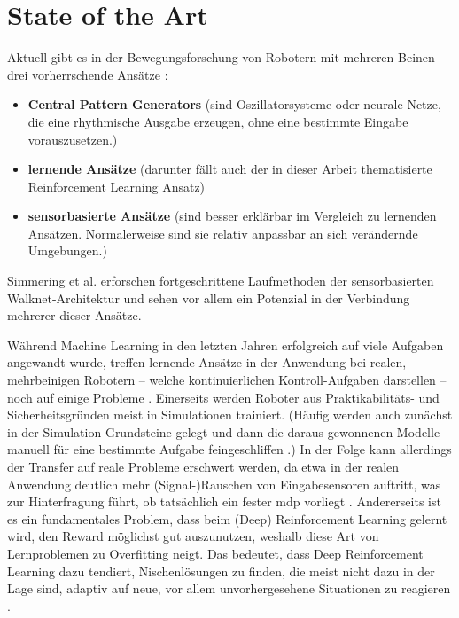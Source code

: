 \chapter{State of the Art}
Aktuell gibt es in der Bewegungsforschung von Robotern mit mehreren Beinen drei vorherrschende Ansätze \cite{simmering2023walknet}:
\begin{itemize}
    \item \textbf{Central Pattern Generators} (sind Oszillatorsysteme oder neurale Netze, die eine rhythmische Ausgabe erzeugen, ohne eine bestimmte Eingabe vorauszusetzen.)
    \item \textbf{lernende Ansätze} (darunter fällt auch der in dieser Arbeit thematisierte Reinforcement Learning Ansatz)
    \item \textbf{sensorbasierte Ansätze} (sind besser erklärbar im Vergleich zu lernenden Ansätzen. Normalerweise sind sie relativ anpassbar an sich verändernde Umgebungen.)
\end{itemize}
Simmering et al. \cite{simmering2023walknet} erforschen fortgeschrittene Laufmethoden der sensorbasierten Walknet-Architektur und sehen vor allem ein Potenzial in der Verbindung mehrerer dieser Ansätze.

Während Machine Learning in den letzten Jahren erfolgreich auf viele Aufgaben angewandt wurde, treffen lernende Ansätze in der Anwendung bei realen, mehrbeinigen Robotern -- welche kontinuierlichen Kontroll-Aufgaben darstellen -- noch auf einige Probleme \cite{schilling2020decentralized}.
Einerseits werden Roboter aus Praktikabilitäts- und Sicherheitsgründen meist in Simulationen trainiert.
(Häufig werden auch zunächst in der Simulation Grundsteine gelegt und dann die daraus gewonnenen Modelle manuell für eine bestimmte Aufgabe feingeschliffen \cite{schilling2020decentralized}.)
In der Folge kann allerdings der Transfer auf reale Probleme erschwert werden, da etwa in der realen Anwendung deutlich mehr (Signal-)Rauschen von Eingabesensoren auftritt, was zur Hinterfragung führt, ob tatsächlich ein fester \ac{mdp} vorliegt \cite{schilling2020decentralized}.
Andererseits ist es ein fundamentales Problem, dass beim (Deep) Reinforcement Learning gelernt wird, den Reward möglichst gut auszunutzen, weshalb diese Art von Lernproblemen zu Overfitting neigt.
Das bedeutet, dass Deep Reinforcement Learning dazu tendiert, Nischenlösungen zu finden, die meist nicht dazu in der Lage sind, adaptiv auf neue, vor allem unvorhergesehene Situationen zu reagieren \cite{schilling2020decentralized}.

